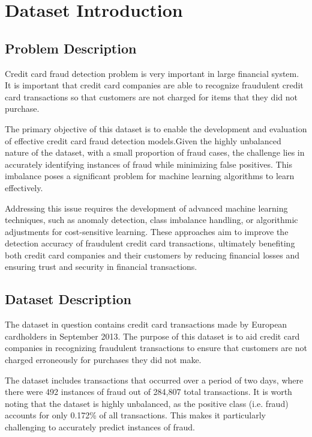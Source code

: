 
\section{Dataset Introduction}
\label{sec:intro}

\subsection{Problem Description}

Credit card fraud detection problem is very important in large financial system. It is important that credit card companies are able to recognize fraudulent credit card transactions so that customers are not charged for items that they did not purchase.

The primary objective of this dataset is to enable the development and evaluation of effective credit card fraud detection models.Given the highly unbalanced nature of the dataset, with a small proportion of fraud cases, the challenge lies in accurately identifying instances of fraud while minimizing false positives. This imbalance poses a significant problem for machine learning algorithms to learn effectively.

Addressing this issue requires the development of advanced machine learning techniques, such as anomaly detection, class imbalance handling, or algorithmic adjustments for cost-sensitive learning. These approaches aim to improve the detection accuracy of fraudulent credit card transactions, ultimately benefiting both credit card companies and their customers by reducing financial losses and ensuring trust and security in financial transactions.

\subsection {Dataset Description}
The dataset in question contains credit card transactions made by European cardholders in September 2013. The purpose of this dataset is to aid credit card companies in recognizing fraudulent transactions to ensure that customers are not charged erroneously for purchases they did not make.

The dataset includes transactions that occurred over a period of two days, where there were 492 instances of fraud out of 284,807 total transactions. It is worth noting that the dataset is highly unbalanced, as the positive class (i.e. fraud) accounts for only 0.172\% of all transactions. This makes it particularly challenging to accurately predict instances of fraud.

